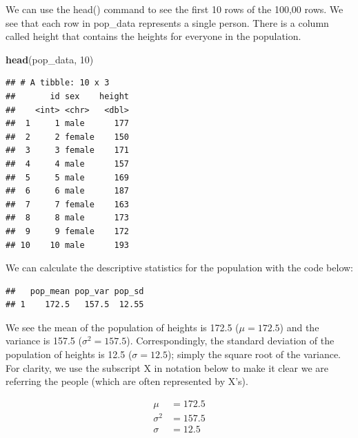 \documentclass[
]{krantz}
\makeatletter
\newenvironment{Shaded}{\begin{snugshade}}{\end{snugshade}}
\newcommand{\DataTypeTok}[1]{\textcolor[rgb]{0.27,0.27,0.27}{#1}}
\newcommand{\DecValTok}[1]{\textcolor[rgb]{0.06,0.06,0.06}{#1}}
\newcommand{\KeywordTok}[1]{\textcolor[rgb]{0.27,0.27,0.27}{\textbf{#1}}}
\newcommand{\NormalTok}[1]{#1}
\newcommand{\OperatorTok}[1]{\textcolor[rgb]{0.43,0.43,0.43}{\textbf{#1}}}
\newcommand{\StringTok}[1]{\textcolor[rgb]{0.5,0.5,0.5}{#1}}
\newenvironment{kframe}{%
\medskip{}
\setlength{\fboxsep}{.8em}
 \def\at@end@of@kframe{}%
 \ifinner\ifhmode%
  \def\at@end@of@kframe{\end{minipage}}%
  \begin{minipage}{\columnwidth}%
 \fi\fi%
 \def\FrameCommand##1{\hskip\@totalleftmargin \hskip-\fboxsep
 \colorbox{shadecolor}{##1}\hskip-\fboxsep
     \hskip-\linewidth \hskip-\@totalleftmargin \hskip\columnwidth}%
 \MakeFramed {\advance\hsize-\width
   \@totalleftmargin\z@ \linewidth\hsize
   \@setminipage}}%
 {\par\unskip\endMakeFramed%
 \at@end@of@kframe}
\renewenvironment{Shaded}{\begin{kframe}}{\end{kframe}}
\makeatother
\begin{document}
We can use the head() command to see the first 10 rows of the 100,00 rows. We see that each row in pop\_data represents a single person. There is a column called height that contains the heights for everyone in the population.

\begin{Shaded}
\begin{Highlighting}[]
\KeywordTok{head}\NormalTok{(pop_data, }\DecValTok{10}\NormalTok{)}
\end{Highlighting}
\end{Shaded}

\begin{verbatim}
## # A tibble: 10 x 3
##       id sex    height
##    <int> <chr>   <dbl>
##  1     1 male      177
##  2     2 female    150
##  3     3 female    171
##  4     4 male      157
##  5     5 male      169
##  6     6 male      187
##  7     7 female    163
##  8     8 male      173
##  9     9 female    172
## 10    10 male      193
\end{verbatim}

We can calculate the descriptive statistics for the population with the code below:

\begin{Shaded}
\end{Shaded}

\begin{verbatim}
##   pop_mean pop_var pop_sd
## 1    172.5   157.5  12.55
\end{verbatim}

We see the mean of the population of heights is 172.5 (\(\mu = 172.5\)) and the variance is 157.5 (\(\sigma^2 = 157.5\)). Correspondingly, the standard deviation of the population of heights is 12.5 (\(\sigma = 12.5\)); simply the square root of the variance. For clarity, we use the subscript X in notation below to make it clear we are referring the people (which are often represented by X's).

\[
\begin{aligned} 
\mu &= 172.5 \\
\sigma^2 &= 157.5 \\
\sigma &= 12.5 \\
\end{aligned} 
\]
\end{document}
